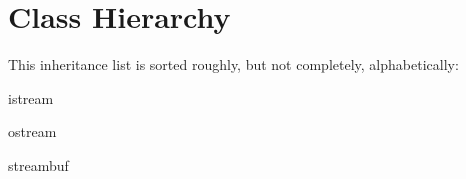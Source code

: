 \section{Class Hierarchy}
This inheritance list is sorted roughly, but not completely, alphabetically\+:\begin{DoxyCompactList}
\item {}
\begin{DoxyCompactList}
\item {}
\end{DoxyCompactList}
\item istream\begin{DoxyCompactList}
\item {}
\end{DoxyCompactList}
\item ostream\begin{DoxyCompactList}
\item {}
\end{DoxyCompactList}
\item streambuf\begin{DoxyCompactList}
\item {}
\begin{DoxyCompactList}
\item {}
\end{DoxyCompactList}
\item {}
\begin{DoxyCompactList}
\item {}
\end{DoxyCompactList}
\end{DoxyCompactList}
\end{DoxyCompactList}
